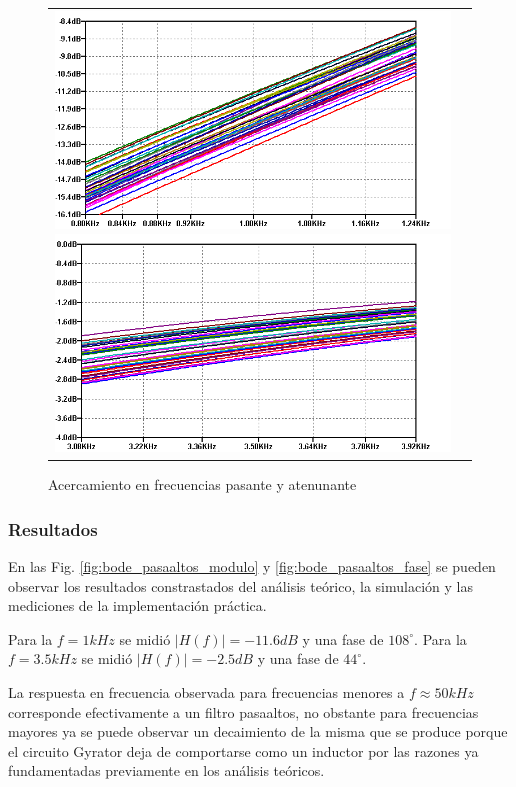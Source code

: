 \begin{figure}[H]
    \centering
    \begin{tabular}{c c}
        \includegraphics[scale=0.4]{../EJ2/Recursos/hp_montecarlo_fa.png}
        \includegraphics[scale=0.4]{../EJ2/Recursos/hp_montecarlo_fp.png}
    \end{tabular}
    \caption{Acercamiento en frecuencias pasante y atenunante}
    \label{fig:hp_montecarlo_frecuencias}
\end{figure}

\subsubsection{Resultados}
En las Fig. \ref{fig:bode_pasaaltos_modulo} y \ref{fig:bode_pasaaltos_fase} se pueden observar los resultados constrastados del an\'alisis te\'orico, la simulaci\'on y las mediciones de la implementaci\'on pr\'actica.

Para la $f = 1kHz$ se midi\'o $|H(f)| = -11.6dB$ y una fase de $108^{\circ}$.
Para la $f = 3.5kHz$ se midi\'o $|H(f)| = -2.5dB$ y una fase de $44^{\circ}$.

La respuesta en frecuencia observada para frecuencias menores a $f \approx 50kHz$ corresponde efectivamente
a un filtro pasaaltos, no obstante para frecuencias mayores ya se puede observar un decaimiento de la misma que se produce
porque el circuito Gyrator deja de comportarse como un inductor por las razones ya fundamentadas previamente en los an\'alisis te\'oricos.

